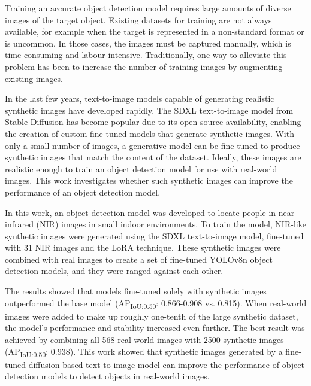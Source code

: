 Training an accurate object detection model requires large amounts of diverse images of the target object. Existing datasets for training are not always available, for example when the target is represented in a non-standard format or is uncommon. In those cases, the images must be captured manually, which is time-consuming and labour-intensive. Traditionally, one way to alleviate this problem has been to increase the number of training images by augmenting existing images.

In the last few years, text-to-image models capable of generating realistic synthetic images have developed rapidly. The SDXL text-to-image model from Stable Diffusion has become popular due to its open-source availability, enabling the creation of custom fine-tuned models that generate synthetic images. With only a small number of images, a generative model can be fine-tuned to produce synthetic images that match the content of the dataset. Ideally, these images are realistic enough to train an object detection model for use with real-world images. This work investigates whether such synthetic images can improve the performance of an object detection model.

In this work, an object detection model was developed to locate people in near-infrared (NIR) images in small indoor environments. To train the model, NIR-like synthetic images were generated using the SDXL text-to-image model, fine-tuned with 31 NIR images and the LoRA technique. These synthetic images were combined with real images to create a set of fine-tuned YOLOv8n object detection models, and they were ranged against each other.

The results showed that models fine-tuned solely with synthetic images outperformed the base model (AP\textsubscript{IoU:0.50}: 0.866-0.908 vs. 0.815). When real-world images were added to make up roughly one-tenth of the large synthetic dataset, the model's performance and stability increased even further. The best result was achieved by combining all 568 real-world images with 2500 synthetic images (AP\textsubscript{IoU:0.50}: 0.938). This work showed that synthetic images generated by a fine-tuned diffusion-based text-to-image model can improve the performance of object detection models to detect objects in real-world images.